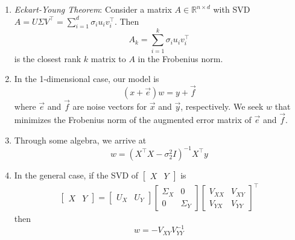 \documentclass[10pt]{article}
\begin{document}
\begin{multicols}{2}
\begin{addmargin}[0.8em]{0.5em}
\begin{enumerate}[label=(\alph*)]
        \item \textit{Eckart-Young Theorem}: Consider a matrix $A \in \mathbb{R}^{n \times d}$ with SVD $A = U \Sigma V^\top = \sum_{i=1}^d \sigma_i u_i v_i^\top$. Then
        $$
        A_k = \sum_{i=1}^{k} \sigma_i u_i v_i^\top
        $$
        is the closest rank $k$ matrix to $A$ in  the Frobenius norm.
        
        \item In the 1-dimensional case, our model is
        $$
        (x+\vec{e})w = y + \vec{f}
        $$
        where $\vec{e}$ and $\vec{f}$ are noise vectors for $\vec{x}$ and $\vec{y}$, respectively. We seek $w$ that minimizes the Frobenius norm of the augmented error matrix of $\vec{e}$ and $\vec{f}$.
        \item Through some algebra, we arrive at
        $$
        w = (X^\top X - \sigma_2^2 I)^{-1} X^\top y
        $$
        \item In the general case, if the SVD of $\begin{bmatrix} X & Y \end{bmatrix}$ is
        \begin{align*}
        \begin{bmatrix} X & Y \end{bmatrix} = \begin{bmatrix} U_X & U_Y \end{bmatrix} \begin{bmatrix} \Sigma_X & 0 \\ 0 & \Sigma_Y \end{bmatrix} \begin{bmatrix} V_{XX} & V_{XY} \\ V_{YX} & V_{YY} \end{bmatrix}^\top
        \end{align*}
        then 
        $$
        w = -V_{XY}V_{YY}^{-1}
        $$
    \end{enumerate}
    

\end{addmargin}
\end{multicols}
\end{document}
